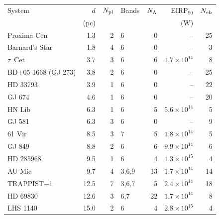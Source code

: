\begin{tabular}{@{}l@{~~}r@{~~}r@{~~}l@{~~}r@{~~}r@{~~}r@{}}
\hline
System & $d$ & $N_{\rm pl}$ & Bands & $N_{\rm A}$ & EIRP$_{90}$ & $N_{\rm eb}$ \\
 & (pc) & & & & (W) & \\
\hline
Proxima Cen & 1.3 & 2 & 6 & 0 & -- & 25 \\
Barnard's Star & 1.8 & 4 & 6 & 0 & -- & 3 \\
$\tau$~Cet & 3.7 & 3 & 6 & 6 & $1.7\times10^{14}$ & 8 \\
BD+05 1668 (GJ 273) & 3.8 & 2 & 6 & 0 & -- & 25 \\
HD 33793 & 3.9 & 1 & 6 & 0 & -- & 22 \\
GJ 674 & 4.6 & 1 & 6 & 0 & -- & 20 \\
HN Lib & 6.3 & 1 & 6 & 5 & $5.6\times10^{14}$ & 5 \\
GJ 581 & 6.3 & 3 & 6 & 0 & -- & 9 \\
61 Vir & 8.5 & 3 & 7 & 5 & $1.8\times10^{14}$ & 5 \\
GJ 849 & 8.8 & 2 & 6 & 6 & $9.9\times10^{14}$ & 6 \\
HD 285968 & 9.5 & 1 & 6 & 4 & $1.3\times10^{15}$ & 4 \\
AU Mic & 9.7 & 4 & 3,6,9 & 13 & $1.7\times10^{14}$ & 14 \\
TRAPPIST$-$1 & 12.5 & 7 & 3,6,7 & 5 & $2.4\times10^{14}$ & 18 \\
HD 69830 & 12.6 & 3 & 6,7 & 22 & $1.7\times10^{14}$ & 8 \\
LHS 1140 & 15.0 & 2 & 6 & 4 & $2.8\times10^{15}$ & 4 \\
\hline
\end{tabular}
